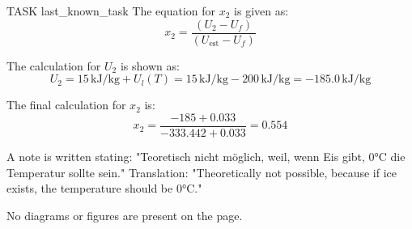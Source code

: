 TASK {last_known_task}  
The equation for \( x_2 \) is given as:  
\[
x_2 = \frac{(U_2 - U_f)}{(U_{\text{est}} - U_f)}
\]  

The calculation for \( U_2 \) is shown as:  
\[
U_2 = 15 \, \text{kJ/kg} + U_l(T) = 15 \, \text{kJ/kg} - 200 \, \text{kJ/kg} = -185.0 \, \text{kJ/kg}
\]  

The final calculation for \( x_2 \) is:  
\[
x_2 = \frac{-185 + 0.033}{-333.442 + 0.033} = 0.554
\]  

A note is written stating:  
"Teoretisch nicht möglich, weil, wenn Eis gibt, 0°C die Temperatur sollte sein."  
Translation: "Theoretically not possible, because if ice exists, the temperature should be 0°C."  

No diagrams or figures are present on the page.
